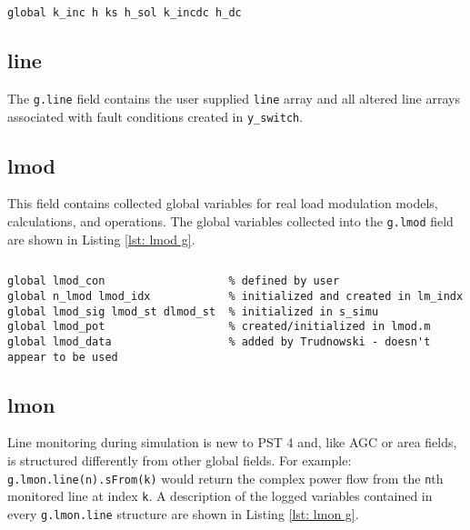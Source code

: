 \begin{lstlisting}[caption={Index Related Global Field Variables},label={lst: k g}]
\end{lstlisting}\vspace{-2 em}
\begin{verbatim}
global k_inc h ks h_sol k_incdc h_dc
\end{verbatim}

\subsection{line}  
The \verb|g.line| field contains the user supplied \verb|line| array and all altered line arrays associated with fault conditions created in \verb|y_switch|.

\subsection{lmod}
This field contains collected global variables for real load modulation models, calculations, and operations.
The global variables collected into the \verb|g.lmod| field are shown in Listing \ref{lst: lmod g}.

\begin{lstlisting}[caption={Real Load Modulation Global Field Variables},label={lst: lmod g}]
\end{lstlisting}\vspace{-2 em}
\begin{verbatim}
global lmod_con                   % defined by user
global n_lmod lmod_idx            % initialized and created in lm_indx
global lmod_sig lmod_st dlmod_st  % initialized in s_simu
global lmod_pot                   % created/initialized in lmod.m 
global lmod_data                  % added by Trudnowski - doesn't appear to be used
\end{verbatim}

\pagebreak
\subsection{lmon}  
Line monitoring during simulation is new to PST 4 and, like AGC or area fields, is structured  differently from other global fields.
For example:\\ \verb|g.lmon.line(n).sFrom(k)| would return the complex power flow from the \verb|n|th monitored line at index \verb|k|.
A description of the logged variables contained in every \verb|g.lmon.line| structure are  shown in Listing \ref{lst: lmon g}.

